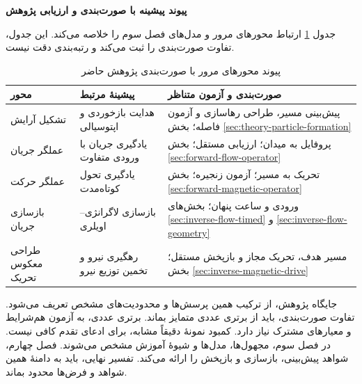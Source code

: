 \textbf{پیوند پیشینه با صورت‌بندی و ارزیابی پژوهش}

جدول \ref{tab:lit-synthesis-thesis-links} ارتباط محورهای مرور و مدل‌های فصل سوم را خلاصه می‌کند.
این جدول، تفاوت صورت‌بندی را ثبت می‌کند و رتبه‌بندی دقت نیست.

\begin{table}[htbp]
\centering
\small
\setlength{\tabcolsep}{4pt}
\caption{پیوند محورهای مرور با صورت‌بندی پژوهش حاضر}
\label{tab:lit-synthesis-thesis-links}
\begin{tabular}{p{}p{}p{}}
\hline
محور & پیشینهٔ مرتبط & صورت‌بندی و آزمون متناظر \\
\hline
تشکیل آرایش
& هدایت بازخوردی و اپتوسیالی \cite{Shenoy2016StokesTrap,Erben2024Optofluidic}
& پیش‌بینی مسیر، طراحی رهاسازی و آزمون فاصله؛ بخش \mbox{\ref{sec:theory-particle-formation}} \\
عملگر جریان
& یادگیری جریان با ورودی متفاوت \cite{Onishi2026FlowConditions}
& پروفایل به میدان؛ ارزیابی مستقل؛ بخش \mbox{\ref{sec:forward-flow-operator}} \\
عملگر حرکت
& یادگیری تحول کوتاه‌مدت \cite{Wang2023LongTime}
& تحریک به مسیر؛ آزمون زنجیره؛ بخش \mbox{\ref{sec:forward-magnetic-operator}} \\
بازسازی جریان
& بازسازی لاگرانژی–اویلری \cite{Wan2026TrajectoryFlowNet,ZhouGrauer2026Joint}
& ورودی و ساعت پنهان؛ بخش‌های \mbox{\ref{sec:inverse-flow-timed}} و \mbox{\ref{sec:inverse-flow-geometry}} \\
طراحی معکوس تحریک
& رهگیری نیرو و تخمین توزیع نیرو \cite{ElHamdaoui2026Tracking,Strayer2024ForceMapping}
& مسیر هدف، تحریک مجاز و بازپخش مستقل؛ بخش \mbox{\ref{sec:inverse-magnetic-drive}} \\
\hline
\end{tabular}
\end{table}

جایگاه پژوهش، از ترکیب همین پرسش‌ها و محدودیت‌های مشخص تعریف می‌شود.
تفاوت صورت‌بندی، باید از برتری عددی متمایز بماند.
برتری عددی، به آزمون هم‌شرایط و معیارهای مشترک نیاز دارد.
کمبود نمونهٔ دقیقاً مشابه، برای ادعای تقدم کافی نیست.
در فصل سوم، مجهول‌ها، مدل‌ها و شیوهٔ آموزش مشخص می‌شوند.
فصل چهارم، شواهد پیش‌بینی، بازسازی و بازپخش را ارائه می‌کند.
تفسیر نهایی، باید به دامنهٔ همین شواهد و فرض‌ها محدود بماند.
